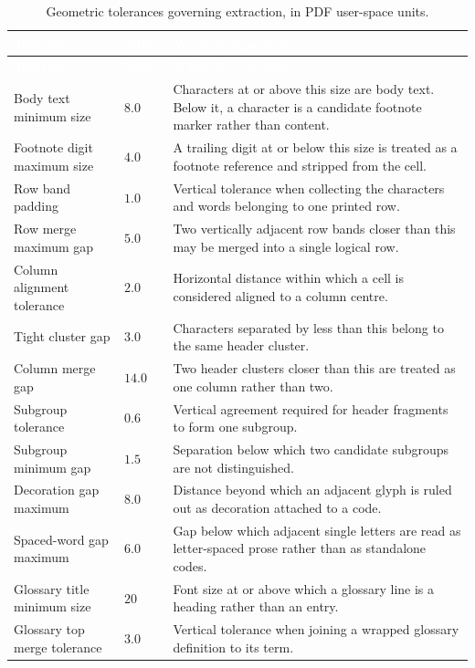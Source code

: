 \begin{longtable}{|p{}|p{}|p{}|}
\caption{Geometric tolerances governing extraction, in PDF user-space units.}\label{tab:geoparams}\\
\hline
\rowcolor{myblue}\textcolor{white}{\textbf{Tolerance}} & \textcolor{white}{\textbf{Value}} & \textcolor{white}{\textbf{What it separates}} \\
\hline
\endfirsthead
\hline
\rowcolor{myblue}\textcolor{white}{\textbf{Tolerance}} & \textcolor{white}{\textbf{Value}} & \textcolor{white}{\textbf{What it separates}} \\
\hline
\endhead
Body text minimum size & $8.0$ & Characters at or above this size are body text. Below it, a character is a candidate footnote marker rather than content. \\ \hline
Footnote digit maximum size & $4.0$ & A trailing digit at or below this size is treated as a footnote reference and stripped from the cell. \\ \hline
Row band padding & $1.0$ & Vertical tolerance when collecting the characters and words belonging to one printed row. \\ \hline
Row merge maximum gap & $5.0$ & Two vertically adjacent row bands closer than this may be merged into a single logical row. \\ \hline
Column alignment tolerance & $2.0$ & Horizontal distance within which a cell is considered aligned to a column centre. \\ \hline
Tight cluster gap & $3.0$ & Characters separated by less than this belong to the same header cluster. \\ \hline
Column merge gap & $14.0$ & Two header clusters closer than this are treated as one column rather than two. \\ \hline
Subgroup tolerance & $0.6$ & Vertical agreement required for header fragments to form one subgroup. \\ \hline
Subgroup minimum gap & $1.5$ & Separation below which two candidate subgroups are not distinguished. \\ \hline
Decoration gap maximum & $8.0$ & Distance beyond which an adjacent glyph is ruled out as decoration attached to a code. \\ \hline
Spaced-word gap maximum & $6.0$ & Gap below which adjacent single letters are read as letter-spaced prose rather than as standalone codes. \\ \hline
Glossary title minimum size & $20$ & Font size at or above which a glossary line is a heading rather than an entry. \\ \hline
Glossary top merge tolerance & $3.0$ & Vertical tolerance when joining a wrapped glossary definition to its term. \\ \hline
\end{longtable}

